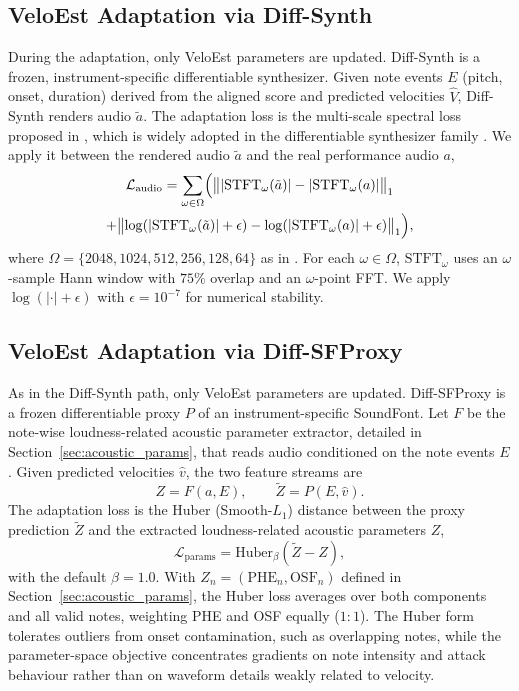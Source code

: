 \documentclass{article}
\begin{document}
\subsection{VeloEst Adaptation via Diff-Synth}
\label{sec:adapt_diffsynth}
During the adaptation, only VeloEst parameters are updated. Diff-Synth is a frozen, instrument-specific differentiable synthesizer. Given note events $E$ (pitch, onset, duration) derived from the aligned score and predicted velocities $\hat{V}$, Diff-Synth renders audio $\tilde{a}$. The adaptation loss is the multi-scale spectral loss proposed in \cite{engel2020ddsp}, which is widely adopted in the differentiable synthesizer family \cite{renault2023ddsp_piano, jonason2024guitar, wu2022mididdsp}. We apply it between the rendered audio $\tilde{a}$ and the real performance audio $a$,
\begin{multline}
\label{eq:audio_loss}
\mathcal{L}_{\mathrm{audio}}
= \sum_{\omega \in \Omega} \Bigl(
\bigl\lVert |\mathrm{STFT}_{\omega}(\tilde{a})| - |\mathrm{STFT}_{\omega}(a)| \bigr\rVert_1 \\
+ \bigl\lVert \log(|\mathrm{STFT}_\omega(\tilde{a})|+\epsilon) - \log(|\mathrm{STFT}_\omega(a)|+\epsilon) \bigr\rVert_1
\Bigr),
\end{multline}
where $\Omega=\{2048,1024,512,256,128,64\}$ as in \cite{engel2020ddsp}. For each 
$\omega\in\Omega$, $\mathrm{STFT}_{\omega}$ uses an $\omega$-sample Hann window 
with $75\%$ overlap and an $\omega$-point FFT. We apply $\log(|\cdot|+\epsilon)$ 
with $\epsilon=10^{-7}$ for numerical stability.
 
\subsection{VeloEst Adaptation via Diff-SFProxy}
\label{sec:adapt_diffsfproxy}
As in the Diff-Synth path, only VeloEst parameters are updated. Diff-SFProxy is a frozen differentiable proxy $P$ of an instrument-specific SoundFont. Let $F$ be the note-wise loudness-related acoustic parameter extractor, detailed in Section~\ref{sec:acoustic_params}, that reads audio conditioned on the note events $E$. Given predicted velocities $\hat{v}$, the two feature streams are
\begin{equation}
\label{eq:sfproxy_features}
    Z = F(a, E), \qquad
    \tilde{Z} = P(E, \hat{v}).
\end{equation}
The adaptation loss is the Huber (Smooth-$L_1$) distance between the proxy prediction $\tilde{Z}$ and the extracted loudness-related acoustic parameters $Z$,
\begin{equation}
\label{eq:param_loss}
    \mathcal{L}_{\mathrm{params}}
    = \mathrm{Huber}_\beta\!\left(\tilde{Z} - Z\right),
\end{equation}
with the default $\beta = 1.0$. With $Z_n=(\mathrm{PHE}_n,\mathrm{OSF}_n)$ defined in Section~\ref{sec:acoustic_params}, the Huber loss averages over both components and all valid notes, weighting PHE and OSF equally ($1{:}1$). The Huber form tolerates outliers from onset contamination, such as overlapping notes, while the parameter-space objective concentrates gradients on note intensity and attack behaviour rather than on waveform details weakly related to velocity.
\end{document}
